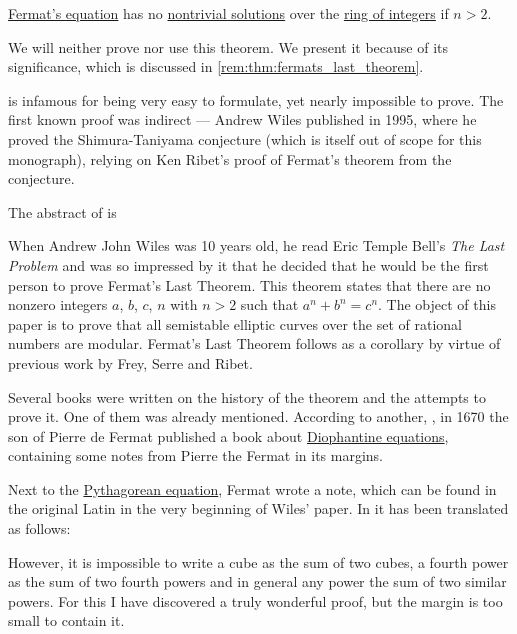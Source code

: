\begin{theorem}\label{thm:fermats_last_theorem}
  \hyperref[def:fermats_equation]{Fermat's equation} has no \hyperref[def:algebraic_equation]{nontrivial solutions} over the \hyperref[def:integers]{ring of integers} if \( n > 2 \).
\end{theorem}
\begin{comments}
  \item We will neither prove nor use this theorem. We present it because of its significance, which is discussed in \cref{rem:thm:fermats_last_theorem}.
\end{comments}

\begin{remark}\label{rem:thm:fermats_last_theorem}
   is infamous for being very easy to formulate, yet nearly impossible to prove. The first known proof was indirect --- Andrew Wiles published \cite{Wiles1995FermatsTheorem} in 1995, where he proved the Shimura-Taniyama conjecture (which is itself out of scope for this monograph), relying on Ken Ribet's proof of Fermat's theorem from the conjecture.

  The abstract of \cite{Wiles1995FermatsTheorem} is
  \begin{displayquote}
    When Andrew John Wiles was 10 years old, he read Eric Temple Bell's \textit{The Last Problem} and was so impressed by it that he decided that he would be the first person to prove Fermat's Last Theorem. This theorem states that there are no nonzero integers \( a \), \( b \), \( c \), \( n \) with \( n > 2 \) such that \( a^n + b^n = c^n \). The object of this paper is to prove that all semistable elliptic curves over the set of rational numbers are modular. Fermat's Last Theorem follows as a corollary by virtue of previous work by Frey, Serre and Ribet.
  \end{displayquote}

  Several books were written on the history of the theorem and the attempts to prove it. One of them was already mentioned. According to another, , in 1670 the son of Pierre de Fermat published a book about \hyperref[def:diophantine_equation]{Diophantine equations}, containing some notes from Pierre the Fermat in its margins.

  Next to the \hyperref[def:fermats_equation]{Pythagorean equation}, Fermat wrote a note, which can be found in the original Latin in the very beginning of Wiles' paper. In \cite[291]{RosenEtAl2018DiscreteMathematicsHandbook} it has been translated as follows:
  \begin{displayquote}
    However, it is impossible to write a cube as the sum of two cubes, a fourth power as the sum of two fourth powers and in general any power the sum of two similar powers. For this I have discovered a truly wonderful proof, but the margin is too small to contain it.
  \end{displayquote}


\end{remark}

